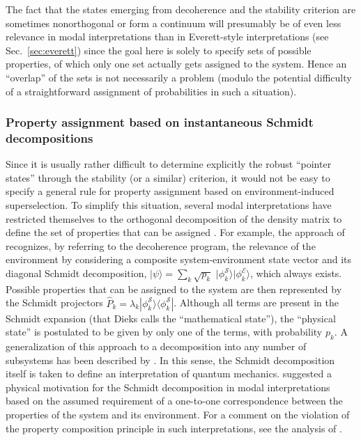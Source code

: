 \documentclass[twocolumn,rmp,aps,amsmath,amsfonts,noshowkeys,noshowpacs]{revtex4}
\newcommand{\ket}[1]{\ensuremath{|{#1\rangle}}}
\newcommand{\ketbra}[2]{\ensuremath{|{#1 \rangle}{\langle #2}|}}
\begin{document}
The fact that the states emerging from decoherence and the stability
criterion are sometimes nonorthogonal or form a continuum will
presumably be of even less relevance in modal interpretations than in
Everett-style interpretations (see Sec.~\ref{sec:everett}) since the
goal here is solely to specify sets of possible properties, of which
only one set actually gets assigned to the system. Hence an
``overlap'' of the sets is not necessarily a problem (modulo the
potential difficulty of a straightforward assignment of probabilities
in such a situation).


\subsubsection{Property assignment based on instantaneous Schmidt decompositions}

Since it is usually rather difficult to determine explicitly the
robust ``pointer states'' through the stability (or a similar)
criterion, it would not be easy to specify a general rule for property
assignment based on environment-induced superselection.  To simplify
this situation, several modal interpretations have restricted
themselves to the orthogonal decomposition of the density matrix to
define the set of properties that can be assigned \citep[see, for
instance,][]{Kochen:1985:po,Healey:1989:cd,Dieks:1989:rm,Vermaas:1995:gd,Bub:1997:iq}.
For example, the approach of \citet{Dieks:1989:rm} recognizes, by
referring to the decoherence program, the relevance of the environment
by considering a composite system-environment state vector and its
diagonal Schmidt decomposition, $\ket{\psi} = \sum_k \sqrt{p_k} \,\,
\ket{\phi^\mathcal{S}_k} \ket{\phi^\mathcal{E}_k}$, which always
exists. Possible properties that can be assigned to the system are
then represented by the Schmidt projectors $\widehat{P}_k = \lambda_k
\ketbra{\phi^\mathcal{S}_k}{\phi^\mathcal{S}_k}$. Although all terms
are present in the Schmidt expansion (that Dieks calls the
``mathematical state''), the ``physical state'' is postulated to be
given by only one of the terms, with probability $p_k$. A
generalization of this approach to a decomposition into any number of
subsystems has been described by \citet{Vermaas:1995:gd}. In this
sense, the Schmidt decomposition itself is taken to define an
interpretation of quantum mechanics. \citet{Dieks:1995:aa} suggested a
physical motivation for the Schmidt decomposition in modal
interpretations based on the assumed requirement of a one-to-one
correspondence between the properties of the system and its
environment. For a comment on the violation of the property
composition principle in such interpretations, see the analysis of
\citet{Clifton:1996:op}.
\end{document}
